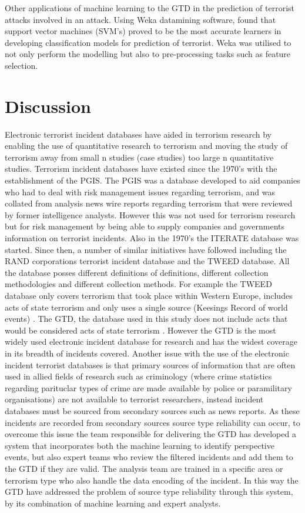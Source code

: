 Other applications of machine learning to the GTD in the prediction of terrorist attacks involved in an attack. Using Weka \citep{hall2009weka} datamining software, \citep{khorshid2015comparison} found that support vector machines (SVM's) proved to be the most accurate learners in developing classification models for prediction of terrorist. Weka was utilised to not only perform the modelling but also to pre-processing tasks such as feature selection. 

\section{Discussion}
Electronic terrorist incident databases have aided in terrorism research by enabling the use of quantitative research to terrorism and moving the study of terrorism away from small n studies (case studies) too large n quantitative studies. Terrorism incident databases have existed since the 1970's with the establishment of the PGIS. The PGIS was a database developed to aid companies who had to deal with risk management issues regarding terrorism, and was collated from analysis news wire reports regarding terrorism that were reviewed by former intelligence analysts. However this was not used for terrorism research but for risk management by being able to supply companies and governments information on terrorist incidents. Also in the 1970's the ITERATE database was started. Since then, a number of similar initiatives have followed including the RAND corporations terrorist incident database and the TWEED database. All the database posses different definitions of definitions, different collection methodologies and different collection methods. For example the TWEED database only covers terrorism that took place within Western Europe, includes acts of state terrorism and only uses a single source (Keesings Record of world events) \citep{ravndal2016right}. The GTD, the database used in this study does not include acts that would be considered acts of state terrorism \citep{lafree2016global}. However the GTD is the most widely used electronic incident database for research and has the widest coverage  in its breadth of incidents covered. Another issue with the use of the electronic incident terrorist databases is that primary sources of information that are often used in allied fields of research such as criminology (where crime statistics regarding parituclar types of crime are made available by police or paramilitary organisations) are not available to terrorist researchers, instead incident databases must be sourced from secondary sources such as news reports. As these incidents are recorded from secondary sources source type reliability can occur, to overcome this issue the team responsible for delivering the GTD has developed a system that incorporates both the machine learning to identify perspective events, but also expert teams who review the filtered incidents and add them to the GTD if they are valid. The analysis team are trained in a specific area  or terrorism type who also handle the data encoding of the incident. In this way the GTD have addressed the problem of source type reliability through this system, by its combination of machine learning and expert analysts.

